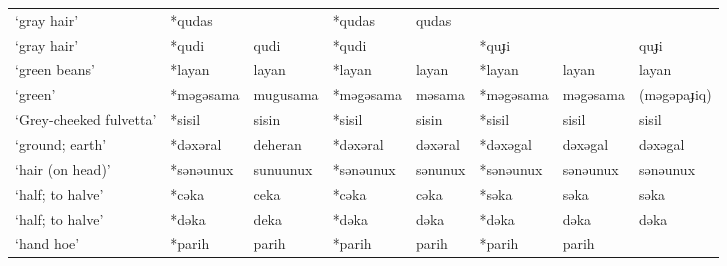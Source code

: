 \begin{landscape}
\begin{longtable}[c]{@{}p{3cm}<{\raggedright}p{2.75cm}<{\raggedright}p{2.75cm}<{\raggedright}p{2.75cm}<{\raggedright}p{2.75cm}<{\raggedright}p{2.75cm}<{\raggedright}p{2.75cm}<{\raggedright}p{2.75cm}<{\raggedright}@{}}
`gray hair'                                          & *qudas       &                               & *qudas         & qudas                      &                  &                          &                                   \\
`gray hair'                                          & *qudi        & qudi                          & *qudi          &                            & *quɟi            &                          & quɟi                              \\
`green beans'                                        & *layan       & layan                         & *layan         & layan                      & *layan           & layan                    & layan                             \\
`green'                                              & *məgəsama    & mugusama                      & *məgəsama      & məsama                     & *məgəsama        & məgəsama                 & (məgəpaɟiq)                       \\
`Grey-cheeked fulvetta'                              & *sisil       & sisin                         & *sisil         & sisin                      & *sisil           & sisil                    & sisil                             \\
`ground; earth'                                      & *dəxəral     & deheran                       & *dəxəral       & dəxəral                    & *dəxəgal         & dəxəgal                  & dəxəgal                           \\
`hair (on head)'                                     & *sənəunux    & sunuunux                      & *sənəunux      & sənunux                    & *sənəunux        & sənəunux                 & sənəunux                          \\
`half; to halve'                                     & *cəka        & ceka                          & *cəka          & cəka                       & *səka            & səka                     & səka                              \\
`half; to halve'                                     & *dəka        & deka                          & *dəka          & dəka                       & *dəka            & dəka                     & dəka                              \\
`hand hoe'                                           & *parih       & parih                         & *parih         & parih                      & *parih           & parih                    &                                   \\

\end{longtable}
\end{landscape}
